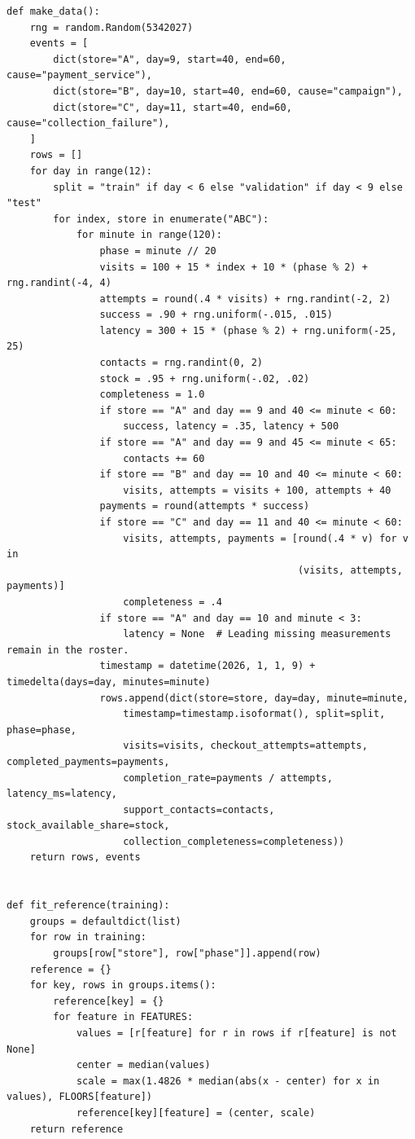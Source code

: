 \begin{Verbatim}[breaklines,breakanywhere,fontsize=\small]
def make_data():
    rng = random.Random(5342027)
    events = [
        dict(store="A", day=9, start=40, end=60, cause="payment_service"),
        dict(store="B", day=10, start=40, end=60, cause="campaign"),
        dict(store="C", day=11, start=40, end=60, cause="collection_failure"),
    ]
    rows = []
    for day in range(12):
        split = "train" if day < 6 else "validation" if day < 9 else "test"
        for index, store in enumerate("ABC"):
            for minute in range(120):
                phase = minute // 20
                visits = 100 + 15 * index + 10 * (phase % 2) + rng.randint(-4, 4)
                attempts = round(.4 * visits) + rng.randint(-2, 2)
                success = .90 + rng.uniform(-.015, .015)
                latency = 300 + 15 * (phase % 2) + rng.uniform(-25, 25)
                contacts = rng.randint(0, 2)
                stock = .95 + rng.uniform(-.02, .02)
                completeness = 1.0
                if store == "A" and day == 9 and 40 <= minute < 60:
                    success, latency = .35, latency + 500
                if store == "A" and day == 9 and 45 <= minute < 65:
                    contacts += 60
                if store == "B" and day == 10 and 40 <= minute < 60:
                    visits, attempts = visits + 100, attempts + 40
                payments = round(attempts * success)
                if store == "C" and day == 11 and 40 <= minute < 60:
                    visits, attempts, payments = [round(.4 * v) for v in
                                                  (visits, attempts, payments)]
                    completeness = .4
                if store == "A" and day == 10 and minute < 3:
                    latency = None  # Leading missing measurements remain in the roster.
                timestamp = datetime(2026, 1, 1, 9) + timedelta(days=day, minutes=minute)
                rows.append(dict(store=store, day=day, minute=minute,
                    timestamp=timestamp.isoformat(), split=split, phase=phase,
                    visits=visits, checkout_attempts=attempts, completed_payments=payments,
                    completion_rate=payments / attempts, latency_ms=latency,
                    support_contacts=contacts, stock_available_share=stock,
                    collection_completeness=completeness))
    return rows, events


def fit_reference(training):
    groups = defaultdict(list)
    for row in training:
        groups[row["store"], row["phase"]].append(row)
    reference = {}
    for key, rows in groups.items():
        reference[key] = {}
        for feature in FEATURES:
            values = [r[feature] for r in rows if r[feature] is not None]
            center = median(values)
            scale = max(1.4826 * median(abs(x - center) for x in values), FLOORS[feature])
            reference[key][feature] = (center, scale)
    return reference



\end{Verbatim}
